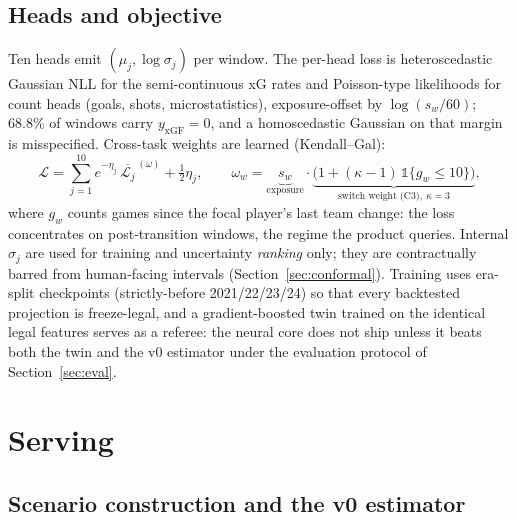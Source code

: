 \documentclass[11pt]{article}
\newcommand{\ind}{\mathbb{1}}
\begin{document}
\subsection{Heads and objective}

Ten heads emit $(\mu_j, \log\sigma_j)$ per window. The per-head loss is heteroscedastic
Gaussian NLL for the semi-continuous xG rates and Poisson-type likelihoods for count heads
(goals, shots, microstatistics), exposure-offset by $\log(s_w/60)$; 68.8\% of windows carry
$y_{\mathrm{xGF}} = 0$, and a homoscedastic Gaussian on that margin is misspecified.
Cross-task weights are learned (Kendall--Gal):
\begin{equation}
\mathcal{L} = \sum_{j=1}^{10} e^{-\eta_j}\,
\overline{\mathcal{L}_j}^{\,(\omega)} + \tfrac{1}{2}\eta_j ,
\qquad
\omega_w = \underbrace{s_w}_{\text{exposure}} \cdot
\underbrace{\big(1 + (\kappa - 1)\,\ind\{g_w \le 10\}\big)}_{\text{switch weight (C3)},\ \kappa = 3},
\end{equation}
where $g_w$ counts games since the focal player's last team change: the loss concentrates
on post-transition windows, the regime the product queries. Internal $\sigma_j$ are used
for training and uncertainty \emph{ranking} only; they are contractually barred from
human-facing intervals (Section~\ref{sec:conformal}). Training uses era-split checkpoints
(strictly-before 2021/22/23/24) so that every backtested projection is freeze-legal, and a
gradient-boosted twin trained on the identical legal features serves as a referee: the
neural core does not ship unless it beats both the twin and the v0 estimator under the
evaluation protocol of Section~\ref{sec:eval}.

\section{Serving}\label{sec:serving}

\subsection{Scenario construction and the v0 estimator}
\end{document}
